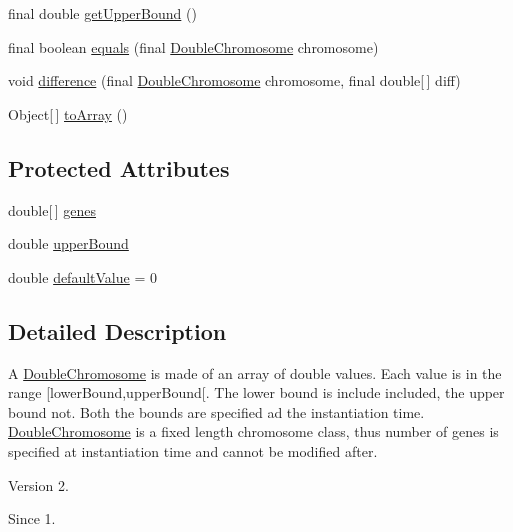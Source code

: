 \begin{DoxyCompactItemize}
\item 
final double \hyperlink{classjenes_1_1chromosome_1_1_double_chromosome_a7f4fe0c4dd1645f02ebbb2633d6610c8}{get\-Upper\-Bound} ()
\item 
final boolean \hyperlink{classjenes_1_1chromosome_1_1_double_chromosome_ad661abf584ceb5195b6b248798709fc9}{equals} (final \hyperlink{classjenes_1_1chromosome_1_1_double_chromosome}{Double\-Chromosome} chromosome)
\item 
void \hyperlink{classjenes_1_1chromosome_1_1_double_chromosome_a10f461747c9f99c02405626cf82aee46}{difference} (final \hyperlink{classjenes_1_1chromosome_1_1_double_chromosome}{Double\-Chromosome} chromosome, final double\mbox{[}$\,$\mbox{]} diff)
\item 
Object\mbox{[}$\,$\mbox{]} \hyperlink{classjenes_1_1chromosome_1_1_double_chromosome_a101d1eb5ebc632c0c5d0a1c5b65daa90}{to\-Array} ()
\end{DoxyCompactItemize}
\subsection*{Protected Attributes}
\begin{DoxyCompactItemize}
\item 
double\mbox{[}$\,$\mbox{]} \hyperlink{classjenes_1_1chromosome_1_1_double_chromosome_a0a987b7f1fa1c4cec652330ad77b6ba6}{genes}
\item 
double \hyperlink{classjenes_1_1chromosome_1_1_double_chromosome_a56362107033b220e75d83b75ea91b74e}{upper\-Bound}
\item 
double \hyperlink{classjenes_1_1chromosome_1_1_double_chromosome_a5c2d56f7d05b08c75013a7529ae46839}{default\-Value} = 0
\end{DoxyCompactItemize}


\subsection{Detailed Description}
A \hyperlink{classjenes_1_1chromosome_1_1_double_chromosome}{Double\-Chromosome} is made of an array of double values. Each value is in the range \mbox{[}lower\-Bound,upper\-Bound\mbox{[}. The lower bound is include included, the upper bound not. Both the bounds are specified ad the instantiation time. \hyperlink{classjenes_1_1chromosome_1_1_double_chromosome}{Double\-Chromosome} is a fixed length chromosome class, thus number of genes is specified at instantiation time and cannot be modified after.

\begin{DoxyVersion}{Version}
2. 
\end{DoxyVersion}
\begin{DoxySince}{Since}
1. 
\end{DoxySince}


